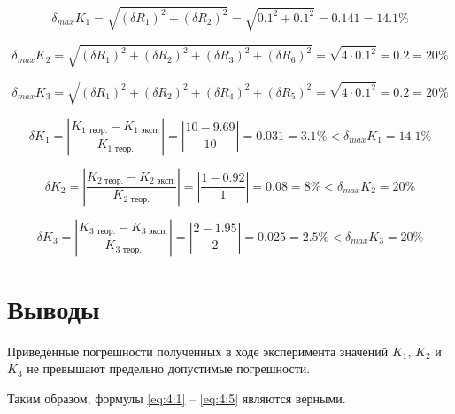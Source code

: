 \begin{displaymath}
	\delta_{max} K_1 = \sqrt{(\delta R_1)^2 + (\delta R_2)^2} = \sqrt{0.1^2 + 0.1^2} = 0.141 = 14.1 \%
\end{displaymath}

\begin{displaymath}
	\delta_{max} K_{2} = \sqrt{(\delta R_1)^2 + (\delta R_2)^2 + (\delta R_3)^2 + (\delta R_6)^2} = \sqrt{4 \cdot 0.1^2} = 0.2 = 20 \%
\end{displaymath}

\begin{displaymath}
	\delta_{max} K_{3} = \sqrt{(\delta R_1)^2 + (\delta R_2)^2 + (\delta R_4)^2 + (\delta R_5)^2} = \sqrt{4 \cdot 0.1^2} = 0.2 = 20 \%
\end{displaymath}

\begin{displaymath}
	\delta K_1 = \left| \frac{K_{1 \text{ теор.}} - K_{1 \text{ эксп.}}}{K_{1 \text{ теор.}}} \right| = \left| \frac{10 - 9.69}{10} \right| = 0.031 = 3.1 \% < \delta_{max} K_{1} = 14.1 \%
\end{displaymath}

\begin{displaymath}
	\delta K_2 = \left| \frac{K_{2 \text{ теор.}} - K_{2 \text{ эксп.}}}{K_{2 \text{ теор.}}} \right| = \left| \frac{1 - 0.92}{1} \right| = 0.08 = 8 \% < \delta_{max} K_{2} = 20 \%
\end{displaymath}

\begin{displaymath}
	\delta K_3 = \left| \frac{K_{3 \text{ теор.}} - K_{3 \text{ эксп.}}}{K_{3 \text{ теор.}}} \right| = \left| \frac{2 - 1.95}{2} \right| = 0.025 = 2.5 \% < \delta_{max} K_{3} = 20 \%
\end{displaymath}

\section{Выводы}

Приведённые погрешности полученных в ходе эксперимента значений $K_1$, $K_2$ и $K_3$ не превышают предельно допустимые погрешности.

Таким образом, формулы \ref{eq:4:1} -- \ref{eq:4:5} являются верными.

